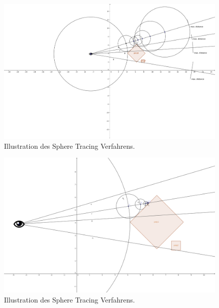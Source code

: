 \begin{figure}[H]
    \caption{Illustration des Sphere Tracing Verfahrens.\protect\footnotemark}\label{fig:sphere_tracing_1}
    \centering
    \includegraphics[width=1.0\textwidth]{img/sphere_tracing_principle_1.png}
\end{figure}
\begin{figure}[H]
    \caption{Illustration des Sphere Tracing Verfahrens.\protect\footnotemark}\label{fig:sphere_tracing_1}
    \centering
    \includegraphics[width=1.0\textwidth]{img/sphere_tracing_principle_2.png}
\end{figure}


